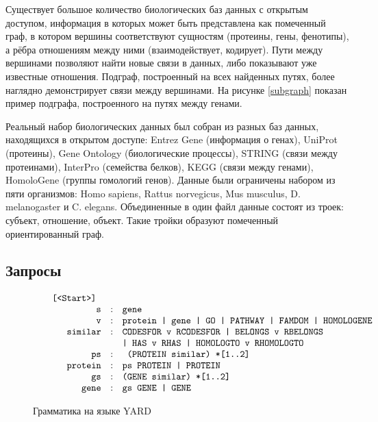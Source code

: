 \documentclass[14pt]{matmex-diploma}
\begin{document}
Существует большое количество биологических баз данных с открытым доступом, информация в которых может быть представлена как помеченный граф, в котором вершины соответствуют сущностям (протеины, гены, фенотипы), а рёбра отношениям между ними (взаимодействует, кодирует). Пути между вершинами позволяют найти новые связи в данных, либо показывают уже известные отношения. Подграф, построенный на всех найденных путях, более наглядно демонстрирует связи между вершинами. На рисунке \ref{subgraph} показан пример подграфа, построенного на путях между генами. 

Реальный набор биологических данных был собран из разных баз данных, находящихся в открытом доступе:  Entrez Gene (информация о генах), UniProt (протеины), Gene Ontology (биологические процессы), STRING (связи между протеинами), InterPro (семейства белков), KEGG (связи между генами), HomoloGene (группы гомологий генов). Данные были ограничены набором из пяти организмов: Homo sapiens, Rattus norvegicus, Mus musculus, D. melanogaster и C. elegans. Объединенные в один файл данные состоят из троек: субъект, отношение, объект. Такие тройки образуют помеченный ориентированный граф.
\subsection{Запросы}

\begin{figure}
$$
\begin{array}{crcl}
&\mbox{\texttt{ [<Start>] }} \\
&\mbox{\texttt{s}} &:& \mbox{\texttt{gene }} \\
&\mbox{\texttt{v}} &:& \mbox{\texttt{protein | gene | GO | PATHWAY | FAMDOM | HOMOLOGENE}} \\
&\mbox{\texttt{similar}} &:& \mbox{\texttt{CODESFOR v RCODESFOR | BELONGS v RBELONGS}} \\
&&&\mbox{\texttt{| HAS v RHAS | HOMOLOGTO v RHOMOLOGTO}} \\
&\mbox{\texttt{ps}} & :& \mbox{\texttt{ (PROTEIN similar) *[1..2]}} \\
&\mbox{\texttt{protein}} & :& \mbox{\texttt{ps PROTEIN | PROTEIN}} \\
&\mbox{\texttt{gs}} & :& \mbox{\texttt{(GENE similar) *[1..2]}} \\
&\mbox{\texttt{gene}} & :& \mbox{\texttt{gs GENE | GENE}} \\
\end{array}
$$
\caption{Грамматика на языке YARD}
\label{grammar}
\end{figure}
\end{document}

